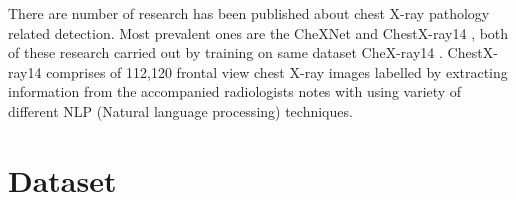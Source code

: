 \documentclass[12pt, twoside, a4paper]{article}
\begin{document}
There are number of research has been published about chest X-ray pathology related detection. Most prevalent ones are the CheXNet \cite{CheXNetRP} and ChestX-ray14 \cite{ChestX-ray8}, both of these research carried out by training on same dataset CheX-ray14 \cite{ChestX-ray8}. ChestX-ray14 comprises of 112,120 frontal view chest X-ray images labelled by extracting information from the accompanied radiologists notes with using variety of different NLP (Natural language processing) techniques. 

\clearpage
\section{Dataset}

\clearpage

\printbibliography
{}
\end{document}
